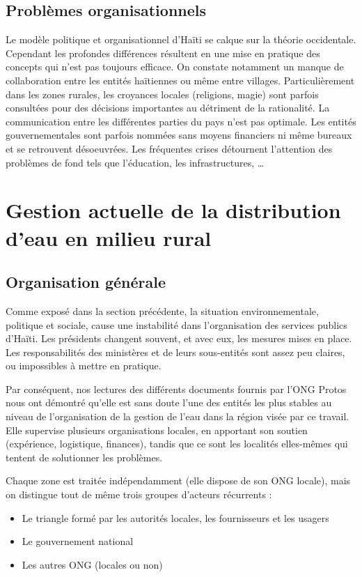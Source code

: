 \documentclass{EPL-master-thesis-covers-FR}
\begin{document}
			\subsection*{Problèmes organisationnels}

				Le modèle politique et organisationnel d'Haïti se calque sur la théorie occidentale. Cependant les profondes différences résultent en une mise en pratique des concepts qui n'est pas toujours efficace.
				On constate notamment un manque de collaboration entre les entités haïtiennes ou même entre villages. Particulièrement dans les zones rurales, les croyances locales (religions, magie) sont parfois consultées pour des décisions importantes au détriment de la rationalité. La communication entre les différentes parties du pays n'est pas optimale. Les entités gouvernementales sont parfois nommées sans moyens financiers ni même bureaux et se retrouvent désoeuvrées. Les fréquentes crises détournent l'attention des problèmes de fond tels que l'éducation, les infrastructures, \dots

		\section{Gestion actuelle de la distribution d'eau en milieu rural}

			\subsection*{Organisation générale}

				Comme exposé dans la section précédente, la situation environnementale, politique et sociale, cause une instabilité dans l'organisation des services publics d'Haïti. Les présidents changent souvent, et avec eux, les mesures mises en place. Les responsabilités des ministères et de leurs sous-entités sont assez peu claires, ou impossibles à mettre en pratique.

				Par conséquent, nos lectures des différents documents fournis par l'ONG Protos nous ont démontré qu'elle est sans doute l'une des entités les plus stables au niveau de l'organisation de la gestion de l'eau dans la région visée par ce travail. Elle supervise plusieurs organisations locales, en apportant son soutien (expérience, logistique, finances), tandis que ce sont les localités elles-mêmes qui tentent de solutionner les problèmes.

				Chaque zone est traitée indépendamment (elle dispose de son ONG locale), mais on distingue tout de même trois groupes d'acteurs récurrents :
				\begin{itemize}
					\item Le triangle formé par les autorités locales, les fournisseurs et les usagers
					\item Le gouvernement national
					\item Les autres ONG (locales ou non)
				\end{itemize}
\end{document}
